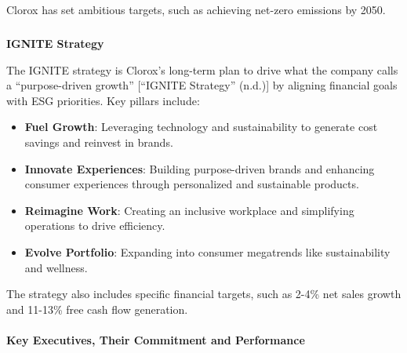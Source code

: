 \documentclass[
  letterpaper,
  DIV=11,
  numbers=noendperiod]{scrartcl}
\makeatletter
\let\oldparagraph\paragraph
\renewcommand{\paragraph}{
    \@ifstar
      \xxxParagraphStar
      \xxxParagraphNoStar
  }
\newcommand{\xxxParagraphStar}[1]{\oldparagraph*{#1}\mbox{}}
\newcommand{\xxxParagraphNoStar}[1]{\oldparagraph{#1}\mbox{}}
\let\oldsubparagraph\subparagraph
\renewcommand{\subparagraph}{
    \@ifstar
      \xxxSubParagraphStar
      \xxxSubParagraphNoStar
  }
\newcommand{\xxxSubParagraphStar}[1]{\oldsubparagraph*{#1}\mbox{}}
\newcommand{\xxxSubParagraphNoStar}[1]{\oldsubparagraph{#1}\mbox{}}
\providecommand{\tightlist}{%
  \setlength{\itemsep}{0pt}\setlength{\parskip}{0pt}}\usepackage{longtable,booktabs,array}
\makeatother
\begin{document}
Clorox has set ambitious targets, such as achieving net-zero emissions
by 2050.

\subparagraph{\texorpdfstring{\textbf{IGNITE
Strategy}}{IGNITE Strategy}}\label{ignite-strategy}

The IGNITE strategy is Clorox's long-term plan to drive what the company
calls a ``purpose-driven growth'' {[}{``{IGNITE Strategy}''} (n.d.){]}
by aligning financial goals with ESG priorities. Key pillars include:

\begin{itemize}
\tightlist
\item
  \textbf{Fuel Growth}: Leveraging technology and sustainability to
  generate cost savings and reinvest in brands.\\
\item
  \textbf{Innovate Experiences}: Building purpose-driven brands and
  enhancing consumer experiences through personalized and sustainable
  products.\\
\item
  \textbf{Reimagine Work}: Creating an inclusive workplace and
  simplifying operations to drive efficiency.\\
\item
  \textbf{Evolve Portfolio}: Expanding into consumer megatrends like
  sustainability and wellness.
\end{itemize}

The strategy also includes specific financial targets, such as 2-4\% net
sales growth and 11-13\% free cash flow generation.

\paragraph{\texorpdfstring{\textbf{Key Executives, Their Commitment and
Performance}}{Key Executives, Their Commitment and Performance}}\label{key-executives-their-commitment-and-performance}
\end{document}
